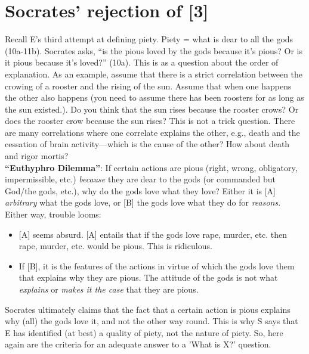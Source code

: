 \documentclass[oneside]{article}
\begin{document}
\section*{Socrates' rejection of [3]}
Recall E's third attempt at defining piety. Piety = what is dear to all the gods (10a-11b). Socrates asks, ``is the pious loved by the gods because it's pious? Or is it pious because it's loved?'' (10a). This is as a question about the order of explanation. As an example, assume that there is a strict correlation between the crowing of a rooster and the rising of the sun. Assume that when one happens the other also happens (you need to assume there has been roosters for as long as the sun existed.). Do you think that the sun rises because the rooster crows? Or does the rooster crow because the sun rises? This is not a trick question. There are many correlations where one correlate explains the other, e.g., death and the cessation of brain activity---which is the cause of the other? How about death and rigor mortis?\\


\noindent \textbf{``Euthyphro Dilemma''}: If certain actions are pious (right, wrong, obligatory, impermissible, etc.) \emph{because} they are dear to the gods (or commanded but God/the gods, etc.), why do the gods love what they love? Either it is [A] \emph{arbitrary} what the gods love, or [B] the gods love what they do for \emph{reasons}. Either way, trouble looms:\begin{itemize}\item{[A] seems absurd. [A] entails that if the gods love rape, murder, etc. then rape, murder, etc. would be pious. This is ridiculous.}\item{If [B], it is the features of the actions in virtue of which the gods love them that explains why they are pious. The attitude of the gods is not what \emph{explains} or \emph{makes it the case} that they are pious.\\} \end{itemize} 


\noindent Socrates ultimately claims that the fact that a certain action is pious explains why (all) the gods love it, and not the other way round. This is why S says that E has identified (at best) a quality of piety, not the nature of piety. So, here again are the criteria for an adequate answer to a 'What is X?' question. 

\end{document}

